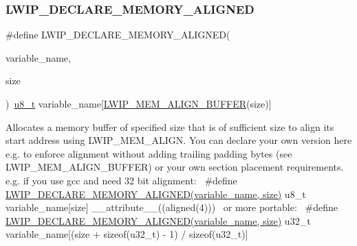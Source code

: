 \subsubsection{\texorpdfstring{L\+W\+I\+P\+\_\+\+D\+E\+C\+L\+A\+R\+E\+\_\+\+M\+E\+M\+O\+R\+Y\+\_\+\+A\+L\+I\+G\+N\+ED}{LWIP\_DECLARE\_MEMORY\_ALIGNED}\hspace{0.1cm}{\footnotesize\ttfamily [2/2]}}
{\footnotesize\ttfamily \#define L\+W\+I\+P\+\_\+\+D\+E\+C\+L\+A\+R\+E\+\_\+\+M\+E\+M\+O\+R\+Y\+\_\+\+A\+L\+I\+G\+N\+ED(\begin{DoxyParamCaption}\item[{}]{variable\+\_\+name,  }\item[{}]{size }\end{DoxyParamCaption})~\hyperlink{group__compiler__abstraction_ga4caecabca98b43919dd11be1c0d4cd8e}{u8\+\_\+t} variable\+\_\+name\mbox{[}\hyperlink{group__compiler__abstraction_ga25591dcb72fccc7b5dc46fbc1959694e}{L\+W\+I\+P\+\_\+\+M\+E\+M\+\_\+\+A\+L\+I\+G\+N\+\_\+\+B\+U\+F\+F\+ER}(size)\mbox{]}}

Allocates a memory buffer of specified size that is of sufficient size to align its start address using L\+W\+I\+P\+\_\+\+M\+E\+M\+\_\+\+A\+L\+I\+GN. You can declare your own version here e.\+g. to enforce alignment without adding trailing padding bytes (see L\+W\+I\+P\+\_\+\+M\+E\+M\+\_\+\+A\+L\+I\+G\+N\+\_\+\+B\+U\+F\+F\+ER) or your own section placement requirements.~\newline
e.\+g. if you use gcc and need 32 bit alignment\+:~\newline
\#define \hyperlink{group__compiler__abstraction_ga651bb349041669fe717b19f127ef16c0}{L\+W\+I\+P\+\_\+\+D\+E\+C\+L\+A\+R\+E\+\_\+\+M\+E\+M\+O\+R\+Y\+\_\+\+A\+L\+I\+G\+N\+E\+D(variable\+\_\+name, size)} u8\+\_\+t variable\+\_\+name\mbox{[}size\mbox{]} \+\_\+\+\_\+attribute\+\_\+\+\_\+((aligned(4)))~\newline
or more portable\+:~\newline
\#define \hyperlink{group__compiler__abstraction_ga651bb349041669fe717b19f127ef16c0}{L\+W\+I\+P\+\_\+\+D\+E\+C\+L\+A\+R\+E\+\_\+\+M\+E\+M\+O\+R\+Y\+\_\+\+A\+L\+I\+G\+N\+E\+D(variable\+\_\+name, size)} u32\+\_\+t variable\+\_\+name\mbox{[}(size + sizeof(u32\+\_\+t) -\/ 1) / sizeof(u32\+\_\+t)\mbox{]} \mbox{\label{group__compiler__abstraction_gaa8e8724eb1c220cbbb90de9e175ce1dc}} 
